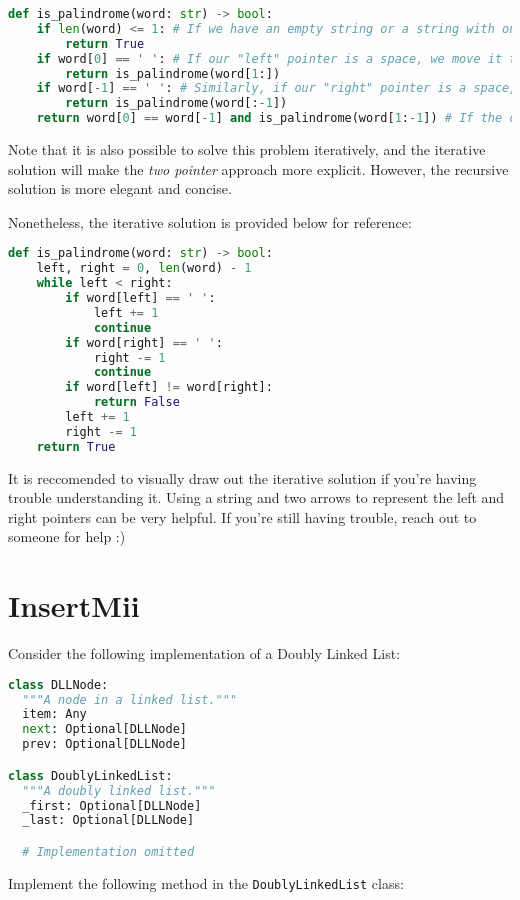 \documentclass{article}
\begin{document}
\begin{lstlisting}[language=Python, style=mystyle]
def is_palindrome(word: str) -> bool:
    if len(word) <= 1: # If we have an empty string or a string with one character, it is a palindrome. This is our base case.
        return True
    if word[0] == ' ': # If our "left" pointer is a space, we move it to the right and call the function again.
        return is_palindrome(word[1:])
    if word[-1] == ' ': # Similarly, if our "right" pointer is a space, we move it to the left and call the function again.
        return is_palindrome(word[:-1])
    return word[0] == word[-1] and is_palindrome(word[1:-1]) # If the characters at the left and right pointers are the same, we move both pointers towards the center and call the function again. If they are not the same, we return False.
\end{lstlisting}

Note that it is also possible to solve this problem iteratively, and the iterative solution will make the \textit{two pointer} approach more explicit. However, the recursive solution is more elegant and concise.

Nonetheless, the iterative solution is provided below for reference:

\begin{lstlisting}[language=Python, style=mystyle]
def is_palindrome(word: str) -> bool:
    left, right = 0, len(word) - 1
    while left < right:
        if word[left] == ' ':
            left += 1
            continue
        if word[right] == ' ':
            right -= 1
            continue
        if word[left] != word[right]:
            return False
        left += 1
        right -= 1
    return True
\end{lstlisting}

It is reccomended to visually draw out the iterative solution if you're having trouble understanding it. Using a string and two arrows to represent the left and right pointers can be very helpful. If you're still having trouble, reach out to someone for help :)

\section{InsertMii}

Consider the following implementation of a Doubly Linked List:

  \begin{lstlisting}[language=Python, style=mystyle]
class DLLNode:
  """A node in a linked list."""
  item: Any
  next: Optional[DLLNode]
  prev: Optional[DLLNode]

class DoublyLinkedList:
  """A doubly linked list."""
  _first: Optional[DLLNode]
  _last: Optional[DLLNode]

  # Implementation omitted
  \end{lstlisting}
  Implement the following method in the \texttt{DoublyLinkedList} class:
\end{document}

